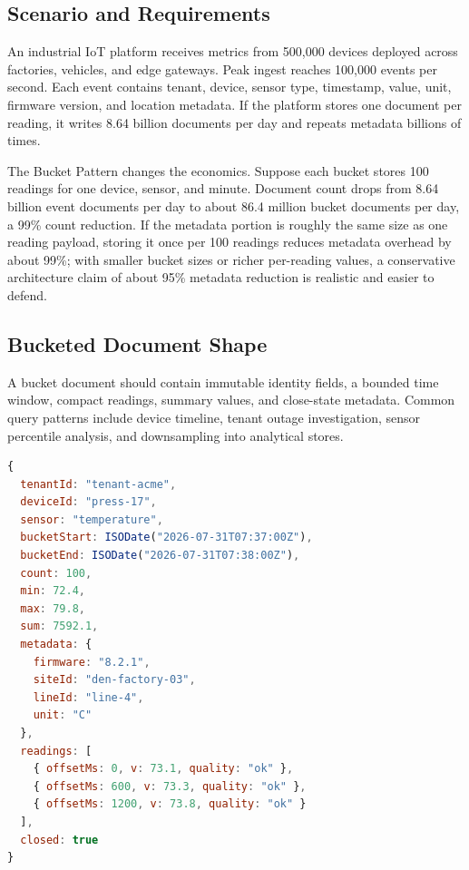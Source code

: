 \subsection{Scenario and Requirements}
An industrial IoT platform receives metrics from 500,000 devices deployed across factories, vehicles, and edge gateways. Peak ingest reaches 100,000 events per second. Each event contains tenant, device, sensor type, timestamp, value, unit, firmware version, and location metadata. If the platform stores one document per reading, it writes 8.64 billion documents per day and repeats metadata billions of times.

The Bucket Pattern changes the economics. Suppose each bucket stores 100 readings for one device, sensor, and minute. Document count drops from 8.64 billion event documents per day to about 86.4 million bucket documents per day, a 99\% count reduction. If the metadata portion is roughly the same size as one reading payload, storing it once per 100 readings reduces metadata overhead by about 99\%; with smaller bucket sizes or richer per-reading values, a conservative architecture claim of about 95\% metadata reduction is realistic and easier to defend.

\subsection{Bucketed Document Shape}
A bucket document should contain immutable identity fields, a bounded time window, compact readings, summary values, and close-state metadata. Common query patterns include device timeline, tenant outage investigation, sensor percentile analysis, and downsampling into analytical stores.

\begin{lstlisting}[language=JavaScript, caption={Bucketed IoT metrics document for one device, sensor, and one-minute window.}]
{
  tenantId: "tenant-acme",
  deviceId: "press-17",
  sensor: "temperature",
  bucketStart: ISODate("2026-07-31T07:37:00Z"),
  bucketEnd: ISODate("2026-07-31T07:38:00Z"),
  count: 100,
  min: 72.4,
  max: 79.8,
  sum: 7592.1,
  metadata: {
    firmware: "8.2.1",
    siteId: "den-factory-03",
    lineId: "line-4",
    unit: "C"
  },
  readings: [
    { offsetMs: 0, v: 73.1, quality: "ok" },
    { offsetMs: 600, v: 73.3, quality: "ok" },
    { offsetMs: 1200, v: 73.8, quality: "ok" }
  ],
  closed: true
}
\end{lstlisting}


